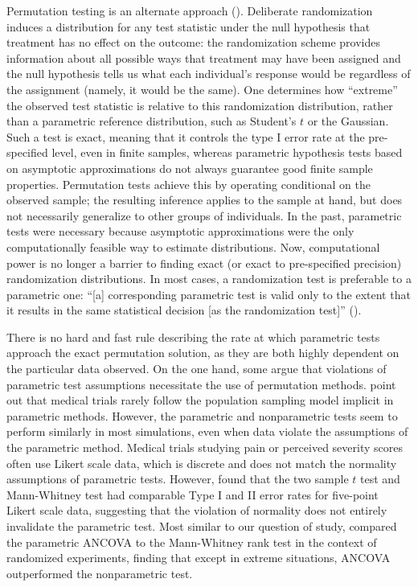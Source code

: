 \documentclass[11pt]{article}
\newcommand{\todo}[1]{{\color{red}{TO DO: \sc #1}}}
\begin{document}
Permutation testing is an alternate approach (\cite{fisher_design_1935, pitman_significance_1937,pitman_significance_1938}).
Deliberate randomization induces a distribution for any test statistic under the null hypothesis that treatment has no effect on the outcome:
the randomization scheme provides information about all possible ways that treatment may have been assigned 
and the null hypothesis tells us what each individual's response would be regardless of the assignment (namely, it would be the same).
One determines how ``extreme'' the observed test statistic is relative to this randomization distribution, rather than a parametric reference distribution, such as Student's $t$ or the Gaussian.
Such a test is exact, meaning that it controls the type I error rate at the pre-specified level, even in finite samples, whereas parametric hypothesis tests based on asymptotic approximations do not always guarantee good finite sample properties.
Permutation tests achieve this by operating conditional on the observed sample; the resulting inference applies to the sample at hand, but does not necessarily generalize to other groups of individuals.
In the past, parametric tests were necessary because asymptotic approximations were the only computationally feasible way to estimate distributions. 
Now, computational power is no longer a barrier to finding exact (or exact to pre-specified precision) randomization distributions.
In most cases, a randomization test is preferable to a parametric one:
``[a] corresponding parametric test is valid only to the extent that it results in the same statistical decision [as the randomization test]'' (\cite{bradley_distribution_1968}).

There is no hard and fast rule describing the rate at which parametric tests approach the exact permutation solution, as they are both highly dependent on the particular data observed.
On the one hand, some argue that violations of parametric test assumptions necessitate the use of permutation methods.
\citet{ludbrook_why_1998} point out that medical trials rarely follow the population sampling model implicit in parametric methods.
However, the parametric and nonparametric tests seem to perform similarly in most simulations, even when data violate the assumptions of the parametric method.
Medical trials studying pain or perceived severity scores often use Likert scale data, which is discrete and does not match the normality assumptions of parametric tests.
However, \citet{winter_five-point_2010} found that the two sample $t$ test and Mann-Whitney test had comparable Type I and II error rates for five-point Likert scale data, suggesting that the violation of normality does not entirely invalidate the parametric test.
\todo{what other linear model comparisons have people done?}
Most similar to our question of study, \citet{vickers_parametric_2005} compared the parametric ANCOVA to the Mann-Whitney rank test in the context of randomized experiments, finding that except in extreme situations, ANCOVA outperformed the nonparametric test.
\end{document}
